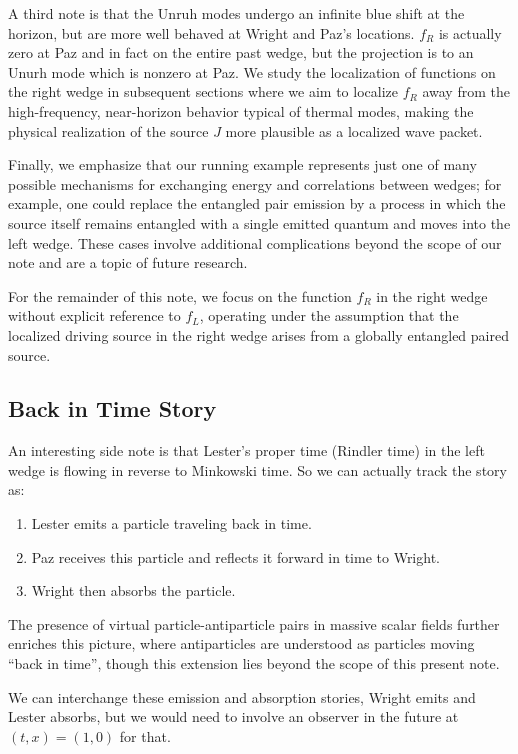 \documentclass[12pt,a4paper]{article}
\begin{document}
A third note is that the Unruh modes undergo an infinite blue shift at the horizon, but are more well behaved at Wright and Paz's locations. $f_R$ is actually zero at Paz and in fact on the entire past wedge, but the projection is to an Unurh mode which is nonzero at Paz. We study the localization of functions on the right wedge in subsequent sections where we aim to localize $f_R$ away from the high-frequency, near-horizon behavior typical of thermal modes, making the physical realization of the source $J$ more plausible as a localized wave packet.

Finally, we emphasize that our running example represents just one of many possible mechanisms for exchanging energy and correlations between wedges; for example, one could replace the entangled pair emission by a process in which the source itself remains entangled with a single emitted quantum and moves into the left wedge. These cases involve additional complications beyond the scope of our note and are a topic of future research.

For the remainder of this note, we focus on the function $f_R$ in the right wedge without explicit reference to $f_L$, operating under the assumption that the localized driving source in the right wedge arises from a globally entangled paired source.

\subsection{Back in Time Story}

An interesting side note is that Lester's proper time (Rindler time) in the left wedge is flowing in reverse to Minkowski time.  So we can actually track the story as:
\begin{enumerate}
\item Lester emits a particle traveling back in time.
\item Paz receives this particle and reflects it forward in time to Wright.
\item Wright then absorbs the particle.
\end{enumerate}
The presence of virtual particle-antiparticle pairs in massive scalar fields further enriches this picture, where antiparticles are understood as particles moving ``back in time'', though this extension lies beyond the scope of this present note.

We can interchange these emission and absorption stories, Wright emits and Lester absorbs, but we would need to involve an observer in the future at $(t,x) = (1,0)$ for that.
\end{document}
